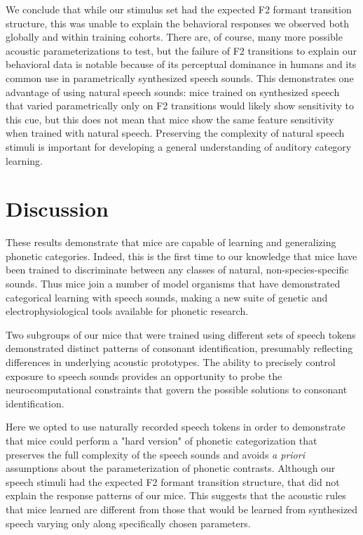 We conclude that while our stimulus set had the expected F2 formant transition structure, this was unable to explain the behavioral responses we observed both globally and within training cohorts. There are, of course, many more possible acoustic parameterizations to test, but the failure of F2 transitions to explain our behavioral data is notable because of its perceptual dominance in humans and its common use in parametrically synthesized speech sounds. This demonstrates one advantage of using natural speech sounds: mice trained on synthesized speech that varied parametrically only on F2 transitions would likely show sensitivity to this cue, but this does not mean that mice show the same feature sensitivity when trained with natural speech. Preserving the complexity of natural speech stimuli is important for developing a general understanding of auditory category learning.

%
%

\section{\Large Discussion}

These results demonstrate that mice are capable of learning and generalizing phonetic categories. Indeed, this is the first time to our knowledge that mice have been trained to discriminate between any classes of natural, non-species-specific sounds. Thus mice join a number of model organisms that have demonstrated categorical learning with speech sounds\cite{Kluender1987,Lotto1997,Kluender2000,Kuhl1978,Engineer2015,Kuhl1983,Dooling1995}, making a new suite of genetic and electrophysiological tools available for phonetic research.

Two subgroups of our mice that were trained using different sets of speech tokens demonstrated distinct patterns of consonant identification, presumably reflecting differences in underlying acoustic prototypes. The ability to precisely control exposure to speech sounds provides an opportunity to probe the neurocomputational constraints that govern the possible solutions to consonant identification.

Here we opted to use naturally recorded speech tokens in order to demonstrate that mice could perform a "hard version" of phonetic categorization that preserves the full complexity of the speech sounds and avoids \textit{a priori} assumptions about the parameterization of phonetic contrasts. Although our speech stimuli had the expected F2 formant transition structure, that did not explain the response patterns of our mice. This suggests that the acoustic rules that mice learned are different from those that would be learned from synthesized speech varying only along specifically chosen parameters.

